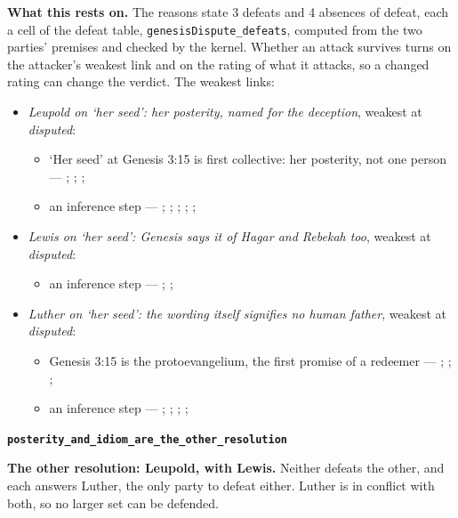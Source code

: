 \documentclass[11pt]{article}
\begin{document}
\par\noindent\textbf{What this rests on.} The reasons state 3 defeats and 4 absences of defeat, each a cell of the defeat table, \texttt{genesis\allowbreak{}Dispute\_\allowbreak{}defeats}, computed from the two parties' premises and checked by the kernel. Whether an attack survives turns on the attacker's weakest link and on the rating of what it attacks, so a changed rating can change the verdict. The weakest links:
\begin{itemize}
\item \emph{Leupold on ‘her seed’: her posterity, named for the deception}, weakest at \emph{disputed}:
\begin{itemize}
\item ‘Her seed’ at Genesis 3:15 is first collective: her posterity, not one person --- \cite[167--169]{leupold-exposition-genesis-1942}; \cite[170]{calvin-commentary-genesis-1847}; \cite[101]{keil-delitzsch-pentateuch-1866}; \cite[145--146]{collins-syntactical-note-1997}
\item an inference step --- \cite[169]{leupold-exposition-genesis-1942}; \cite[101--102]{keil-delitzsch-pentateuch-1866}; \cite[170]{calvin-commentary-genesis-1847}; \cite[III.23.7]{irenaeus-against-heresies-180}; \cite[V.21.1]{irenaeus-against-heresies-180}; \cite[ad loc. Gen 3:15]{henry-commentary-whole-bible}
\end{itemize}
\item \emph{Lewis on ‘her seed’: Genesis says it of Hagar and Rebekah too}, weakest at \emph{disputed}:
\begin{itemize}
\item an inference step --- \cite[299--300]{lewis-womans-seed-1991}; \cite[319]{lewis-womans-seed-1991}; \cite{akin-woman-seed-serpent-1999}
\end{itemize}
\item \emph{Luther on ‘her seed’: the wording itself signifies no human father}, weakest at \emph{disputed}:
\begin{itemize}
\item Genesis 3:15 is the protoevangelium, the first promise of a redeemer --- \cite[167]{leupold-exposition-genesis-1942}; \cite[102]{keil-delitzsch-pentateuch-1866}; \cite{miravalle-meet-your-mother-2014}; \cite[318]{lewis-womans-seed-1991}
\item an inference step --- \cite[298--299]{luther-on-the-creation-1904}; \cite[ad loc. Gen 3:15]{henry-commentary-whole-bible}; \cite[167--169]{leupold-exposition-genesis-1942}; \cite[102]{keil-delitzsch-pentateuch-1866}; \cite[319]{lewis-womans-seed-1991}
\end{itemize}
\end{itemize}
\par\medskip\noindent\textbf{\texttt{posterity\_\allowbreak{}and\_\allowbreak{}idiom\_\allowbreak{}are\_\allowbreak{}the\_\allowbreak{}other\_\allowbreak{}resolution}}\par\nobreak\noindent
\textbf{The other resolution: Leupold, with Lewis.} Neither defeats the other, and each answers Luther, the only party to defeat either. Luther is in conflict with both, so no larger set can be defended.
\end{document}

